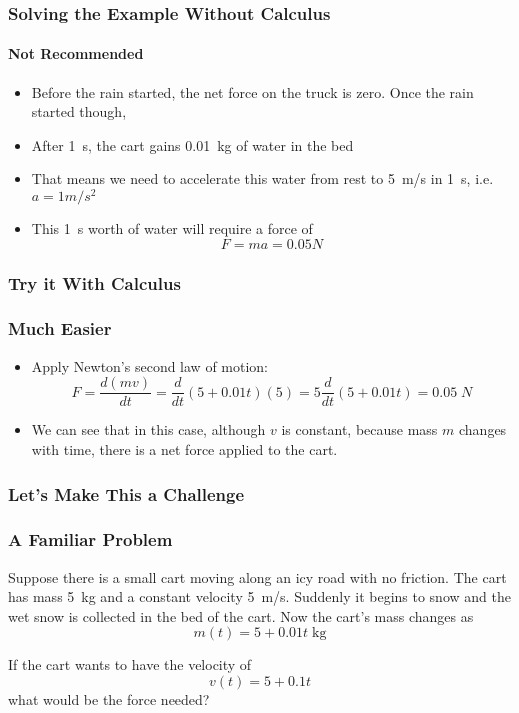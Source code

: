 \documentclass[12pt,compress,aspectratio=169]{beamer}
\begin{document}
\begin{frame}
  \frametitle{Solving the Example Without Calculus}
  \framesubtitle{Not Recommended}
  \begin{itemize}
  \item Before the rain started, the net force on the truck is zero. Once the
    rain started though,
  \item After \SI{1}{\s}, the cart gains \SI{0.01}{\kg} of water in the bed
  \item That means we need to accelerate this water from rest to
    \SI{5}{m/s} in \SI{1}{\s}, i.e.\ $a=1\si{m/s^2}$
  \item This \SI{1}{\s} worth of water will require a force of
    \begin{displaymath}
      F=ma=0.05\si{N}
    \end{displaymath}
  \end{itemize}
\end{frame}


\begin{frame}
  \frametitle{Try it With Calculus}
  \frametitle{Much Easier}
  \begin{itemize}
  \item Apply Newton's second law of motion:
    \begin{displaymath}
      F=\frac{d(mv)}{dt}=\frac{d}{dt}(5+0.01t)(5)=5\frac{d}{dt}(5+0.01t)=
      0.05\;\si{N}
    \end{displaymath}
  \item We can see that in this case, although $v$ is constant, because mass
    $m$ changes with time, there is a net force applied to the cart. 
  \end{itemize}

\end{frame}

\begin{frame}
  \frametitle{Let's Make This a Challenge}
  \frametitle{A Familiar Problem}
  Suppose there is a small cart moving along an icy road with no friction. The
  cart has mass \SI{5}{kg} and a constant velocity \SI{5}{m/s}. Suddenly it
  begins to snow and the wet snow is collected in the bed of the cart. Now the
  cart's mass changes as
  \begin{displaymath}
    m(t)=5+0.01t\;\si{\kg}
  \end{displaymath}

  If the cart wants to have the velocity of
  \begin{displaymath}
    v(t)=5+0.1t
  \end{displaymath}
  what would be the force needed?
\end{frame}
\end{document}
